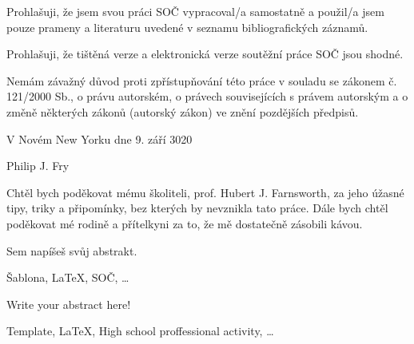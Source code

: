 \documentclass[12pt, a4paper,
    twoside,        %
    openright
]{report}
\newcommand\consultant{prof. Hubert J. Farnsworth} %
\newcommand\authorName{Philip J. Fry}  %
\begin{document}
\noindent Prohlašuji, že jsem svou práci SOČ vypracoval/a samostatně a použil/a jsem pouze prameny a literaturu uvedené v seznamu bibliografických záznamů.

\noindent Prohlašuji, že tištěná verze a elektronická verze soutěžní práce SOČ jsou shodné.

\noindent Nemám závažný důvod proti zpřístupňování této práce v souladu se zákonem č. 121/2000 Sb., o právu autorském, o právech souvisejících s právem autorským a o změně některých zákonů (autorský zákon) ve znění pozdějších předpisů.

\vspace{24 pt}

\noindent V Novém New Yorku dne 9. září 3020 \dotfill{}

\hspace{8cm} \authorName

\cleardoublepage

\vspace*{0.8\textheight}

\noindent
Chtěl bych poděkovat mému školiteli, \consultant, za jeho úžasné tipy, triky a připomínky, bez kterých by nevznikla tato práce. Dále bych chtěl poděkovat mé rodině a přítelkyni za to, že mě dostatečně zásobili kávou.

\cleardoublepage


\noindent Sem napíšeš svůj abstrakt. \lipsum[1] %

\vspace{18pt}


\noindent Šablona, \LaTeX, SOČ, \dots

\vspace{18pt}


\noindent Write your abstract here! \lipsum[1] %

\vspace{18pt}


\noindent Template, \LaTeX, High school proffessional activity, \dots

\cleardoublepage

\tableofcontents
\end{document}
